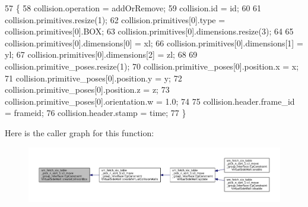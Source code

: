 \begin{DoxyCode}
57         \{
58             collision.operation = addOrRemove;
59             collision.id = id;
60 
61             collision.primitives.resize(1);
62             collision.primitives[0].type = collision.primitives[0].BOX;
63             collision.primitives[0].dimensions.resize(3);
64 
65             collision.primitives[0].dimensions[0] = xl;
66             collision.primitives[0].dimensions[1] = yl;
67             collision.primitives[0].dimensions[2] = zl;
68 
69             collision.primitive\_poses.resize(1);
70             collision.primitive\_poses[0].position.x = x;
71             collision.primitive\_poses[0].position.y = y;
72             collision.primitive\_poses[0].position.z = z;
73             collision.primitive\_poses[0].orientation.w = 1.0;
74 
75             collision.header.frame\_id = frameid;
76             collision.header.stamp = time;
77         \}
\end{DoxyCode}
Here is the caller graph for this function\+:
\nopagebreak
\begin{figure}[H]
\begin{center}
\leavevmode
\includegraphics[width=350pt]{classsm__fetch__six__table__pick__n__sort__1_1_1cl__move__group__interface_1_1CpConstraintVirtualSideWall_a1d7e720febc886a8b140eec81b2b397f_icgraph}
\end{center}
\end{figure}
\mbox{\label{classsm__fetch__six__table__pick__n__sort__1_1_1cl__move__group__interface_1_1CpConstraintVirtualSideWall_a7955eab48e3804a396bd91092c59094b}} 
